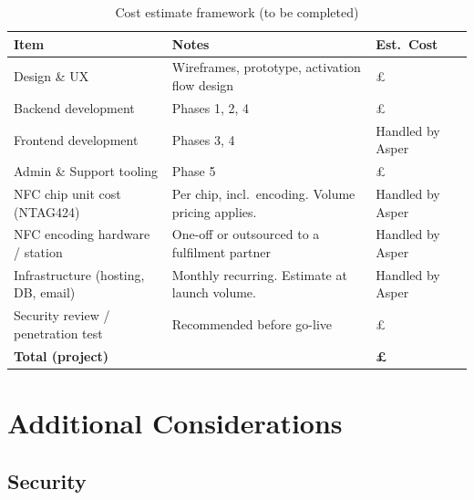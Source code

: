 \documentclass[
	a4paper, %
]{ChaosEngineReport}
\begin{document}
\begin{table}[h!]
\centering
\small
{}
\begin{tabularx}{\linewidth}{@{} L{5.5cm} X L{3.0cm} @{}}
  \toprule
  \textbf{Item} &
  \textbf{Notes} &
  \textbf{Est.\ Cost} \\
  \midrule
  Design \& UX & Wireframes, prototype, activation flow design & £\underline{\hspace{2.5cm}} \\
  Backend development & Phases 1, 2, 4 & £\underline{\hspace{2.5cm}} \\
  Frontend development & Phases 3, 4 & Handled by Asper \\
  Admin \& Support tooling & Phase 5 & £\underline{\hspace{2.5cm}} \\
  NFC chip unit cost (NTAG424) & Per chip, incl.\ encoding. Volume pricing applies. & Handled by Asper \\
  NFC encoding hardware / station & One-off or outsourced to a fulfilment partner & Handled by Asper \\
  Infrastructure (hosting, DB, email) & Monthly recurring. Estimate at launch volume. & Handled by Asper \\
  Security review / penetration test & Recommended before go-live & £\underline{\hspace{2.5cm}} \\
  \textbf{Total (project)} & & \textbf{£\underline{\hspace{2.5cm}}} \\
\end{tabularx}
\caption{Cost estimate framework (to be completed)}
\end{table}

\newpage

\section{Additional Considerations}

\subsection{Security}
\end{document}
